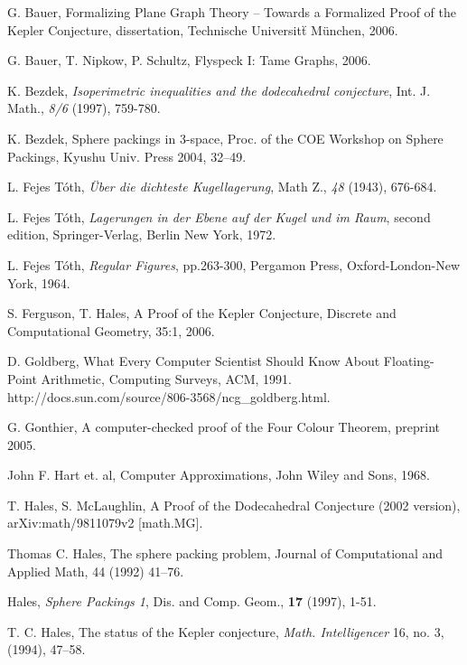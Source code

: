 \documentclass{article} %
\begin{document}
\begin{thebibliography}{HeHa94}

 G. Bauer, Formalizing Plane Graph
Theory -- Towards a Formalized Proof of the Kepler
Conjecture, dissertation, Technische
Universit\"t M\"unchen, 2006.

 G. Bauer, T. Nipkow, P. Schultz,
Flyspeck I: Tame Graphs, 2006.

 K. Bezdek, {\it Isoperimetric inequalities and the
dodecahedral conjecture}, Int. J. Math., \emph{8/6} (1997), 759-780.

 K. Bezdek, Sphere packings in $3$-space,
Proc. of the COE Workshop on Sphere Packings, Kyushu Univ. Press 2004, 32--49.

 L. Fejes T\'oth, {\it \"Uber die dichteste
Kugellagerung}, Math Z., \emph{48} (1943), 676-684.

 L. Fejes T\'oth, {\it Lagerungen in der Ebene auf der
    Kugel und im Raum}, second edition,
    Springer-Verlag, Berlin New York, 1972.

 L. Fejes T\'oth, {\it Regular Figures}, pp.263-300,
Pergamon Press, Oxford-London-New York, 1964.


 S. Ferguson, T. Hales, A Proof of the
Kepler Conjecture, 
Discrete and Computational Geometry, 35:1, 2006.

 D. Goldberg, What Every Computer Scientist Should
Know About Floating-Point Arithmetic, Computing Surveys, ACM, 1991.
http://docs.sun.com/source/806-3568/ncg\_goldberg.html.

 G. Gonthier, A computer-checked proof of the Four
Colour Theorem, preprint 2005.

 John F. Hart et. al, Computer Approximations, John
Wiley and Sons, 1968.

 T. Hales, S. McLaughlin,
A Proof of the Dodecahedral Conjecture (2002 version),  	arXiv:math/9811079v2 [math.MG].

 Thomas C. Hales, The sphere packing problem, Journal
of Computational and Applied Math, 44 (1992) 41--76.

 Hales, {\it Sphere Packings 1}, Dis. and Comp. Geom., 
{\bf 17} (1997), 1-51.

 T. C. Hales, The status of the Kepler conjecture,
    {\it Math. Intelligencer} 16, no. 3, (1994), 47--58.


\end{thebibliography}
\end{document}
